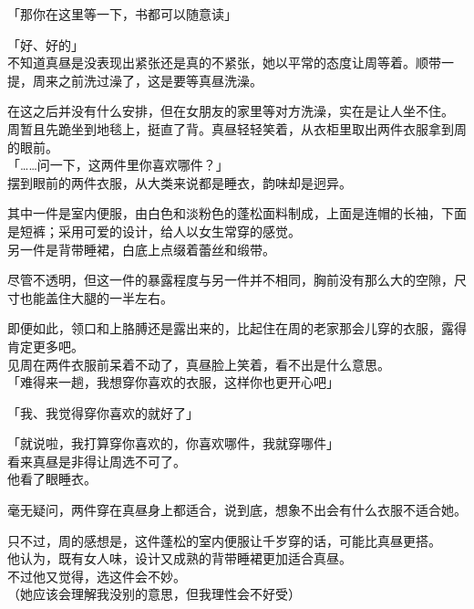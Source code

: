 「那你在这里等一下，书都可以随意读」

「好、好的」\\

不知道真昼是没表现出紧张还是真的不紧张，她以平常的态度让周等着。顺带一提，周来之前洗过澡了，这是要等真昼洗澡。

在这之后并没有什么安排，但在女朋友的家里等对方洗澡，实在是让人坐不住。\\

周暂且先跪坐到地毯上，挺直了背。真昼轻轻笑着，从衣柜里取出两件衣服拿到周的眼前。\\

「……问一下，这两件里你喜欢哪件？」\\

摆到眼前的两件衣服，从大类来说都是睡衣，韵味却是迥异。

其中一件是室内便服，由白色和淡粉色的蓬松面料制成，上面是连帽的长袖，下面是短裤；采用可爱的设计，给人以女生常穿的感觉。\\

另一件是背带睡裙，白底上点缀着蕾丝和缎带。

尽管不透明，但这一件的暴露程度与另一件并不相同，胸前没有那么大的空隙，尺寸也能盖住大腿的一半左右。

即便如此，领口和上胳膊还是露出来的，比起住在周的老家那会儿穿的衣服，露得肯定更多吧。\\

见周在两件衣服前呆着不动了，真昼脸上笑着，看不出是什么意思。\\

「难得来一趟，我想穿你喜欢的衣服，这样你也更开心吧」

「我、我觉得穿你喜欢的就好了」

「就说啦，我打算穿你喜欢的，你喜欢哪件，我就穿哪件」\\

看来真昼是非得让周选不可了。\\

他看了眼睡衣。

毫无疑问，两件穿在真昼身上都适合，说到底，想象不出会有什么衣服不适合她。

只不过，周的感想是，这件蓬松的室内便服让千岁穿的话，可能比真昼更搭。\\

他认为，既有女人味，设计又成熟的背带睡裙更加适合真昼。\\

不过他又觉得，选这件会不妙。\\

（她应该会理解我没别的意思，但我理性会不好受）\\

